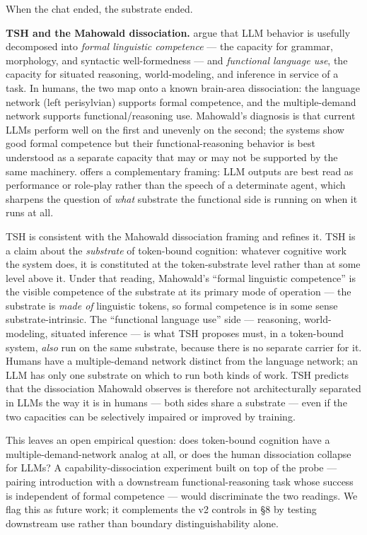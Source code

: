 \documentclass[11pt,a4paper]{article}
\begin{document}
When the chat ended, the substrate ended.

\textbf{TSH and the Mahowald dissociation.} \citet{mahowald2024dissociating} argue that LLM behavior is usefully decomposed into \textit{formal linguistic competence} --- the capacity for grammar, morphology, and syntactic well-formedness --- and \textit{functional language use}, the capacity for situated reasoning, world-modeling, and inference in service of a task. In humans, the two map onto a known brain-area dissociation: the language network (left perisylvian) supports formal competence, and the multiple-demand network supports functional/reasoning use. Mahowald's diagnosis is that current LLMs perform well on the first and unevenly on the second; the systems show good formal competence but their functional-reasoning behavior is best understood as a separate capacity that may or may not be supported by the same machinery. \citet{shanahan2024role} offers a complementary framing: LLM outputs are best read as performance or role-play rather than the speech of a determinate agent, which sharpens the question of \textit{what} substrate the functional side is running on when it runs at all.

TSH is consistent with the Mahowald dissociation framing and refines it. TSH is a claim about the \textit{substrate} of token-bound cognition: whatever cognitive work the system does, it is constituted at the token-substrate level rather than at some level above it. Under that reading, Mahowald's ``formal linguistic competence'' is the visible competence of the substrate at its primary mode of operation --- the substrate is \textit{made of} linguistic tokens, so formal competence is in some sense substrate-intrinsic. The ``functional language use'' side --- reasoning, world-modeling, situated inference --- is what TSH proposes must, in a token-bound system, \textit{also} run on the same substrate, because there is no separate carrier for it. Humans have a multiple-demand network distinct from the language network; an LLM has only one substrate on which to run both kinds of work. TSH predicts that the dissociation Mahowald observes is therefore not architecturally separated in LLMs the way it is in humans --- both sides share a substrate --- even if the two capacities can be selectively impaired or improved by training.

This leaves an open empirical question: does token-bound cognition have a multiple-demand-network analog at all, or does the human dissociation collapse for LLMs? A capability-dissociation experiment built on top of the probe --- pairing introduction with a downstream functional-reasoning task whose success is independent of formal competence --- would discriminate the two readings. We flag this as future work; it complements the v2 controls in \S8 by testing downstream use rather than boundary distinguishability alone.
\end{document}
